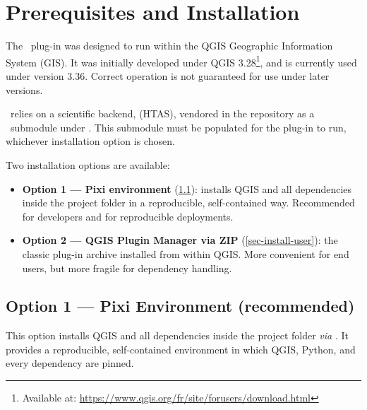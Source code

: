 \chapter{Prerequisites and Installation}
\label{chap-setup}

\renewcommand{\headrulewidth}{0.3pt} 
\fancyhead[LE]{\thepage} 
\fancyhead[RE]{\nouppercase{\textbf{\leftmark}}}
\fancyhead[RO]{\thepage} 
\fancyhead[LO]{\nouppercase{\textbf{\rightmark}}}
\fancyfoot[L,C,R]{}

\setlength{\parindent}{0.35cm} 

\minitoc
\newpage


The \cwv~plug-in was designed to run within the QGIS Geographic Information System (GIS). It was initially developed under QGIS 3.28\footnote{Available at: \href{https://www.qgis.org/fr/site/forusers/download.html}{https://www.qgis.org/fr/site/forusers/download.html}}, and is currently used under version 3.36. Correct operation is not guaranteed for use under later versions.

\cwv~relies on a scientific backend,  (HTAS), vendored in the repository as a \gitlab~submodule under . This submodule must be populated for the plug-in to run, whichever installation option is chosen.

Two installation options are available:
\begin{itemize}
    \item \textbf{Option 1 --- Pixi environment} (\cref{sec-install-pixi}): installs QGIS and all dependencies inside the project folder in a reproducible, self-contained way. Recommended for developers and for reproducible deployments.
    \item \textbf{Option 2 --- QGIS Plugin Manager via ZIP} (\cref{sec-install-user}): the classic plug-in archive installed from within QGIS. More convenient for end users, but more fragile for dependency handling.
\end{itemize}

\section{Option 1 --- Pixi Environment (recommended)} \label{sec-install-pixi}

This option installs QGIS and all dependencies inside the project folder \textit{via} \href{https://pixi.sh}{}. It provides a reproducible, self-contained environment in which QGIS, Python, and every dependency are pinned.

